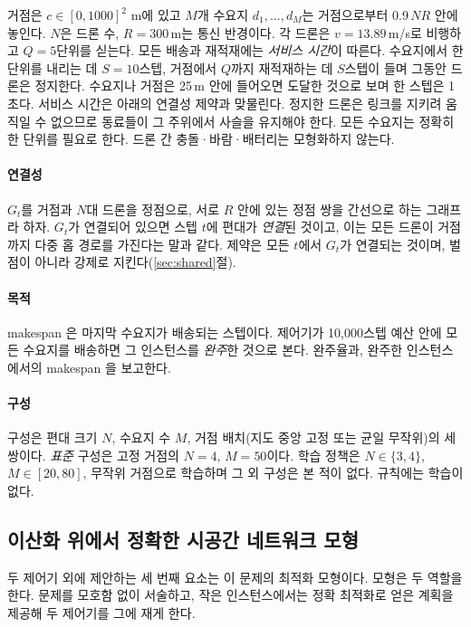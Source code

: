 \documentclass[final,5p,times,twocolumn]{elsarticle}
\begin{document}
거점은 $c \in [0,1000]^2$ m에 있고 $M$개 수요지 $d_1,\dots,d_M$는 거점으로부터 $0.9\,N R$
안에 놓인다. $N$은 드론 수, $R = 300$\,m는 통신 반경이다. 각 드론은 $v = 13.89$\,m/s로 비행하고
$Q = 5$단위를 싣는다. 모든 배송과 재적재에는 \emph{서비스 시간}이 따른다. 수요지에서 한 단위를
내리는 데 $S = 10$스텝, 거점에서 $Q$까지 재적재하는 데 $S$스텝이 들며 그동안 드론은 정지한다.
수요지나 거점은 25\,m 안에 들어오면 도달한 것으로 보며 한 스텝은 1초다. 서비스 시간은 아래의
연결성 제약과 맞물린다. 정지한 드론은 링크를 지키려 움직일 수 없으므로 동료들이 그 주위에서 사슬을
유지해야 한다. 모든 수요지는 정확히 한 단위를 필요로 한다. 드론 간 충돌·바람·배터리는 모형화하지
않는다.

\paragraph{연결성}
$G_t$를 거점과 $N$대 드론을 정점으로, 서로 $R$ 안에 있는 정점 쌍을 간선으로 하는 그래프라 하자.
$G_t$가 연결되어 있으면 스텝 $t$에 편대가 \emph{연결}된 것이고, 이는 모든 드론이 거점까지 다중 홉
경로를 가진다는 말과 같다. 제약은 모든 $t$에서 $G_t$가 연결되는 것이며, 벌점이 아니라 강제로
지킨다(\ref{sec:shared}절).

\paragraph{목적}
makespan 은 마지막 수요지가 배송되는 스텝이다. 제어기가 10{,}000스텝 예산 안에 모든 수요지를
배송하면 그 인스턴스를 \emph{완주}한 것으로 본다. 완주율과, 완주한 인스턴스에서의 makespan 을
보고한다.

\paragraph{구성}
구성은 편대 크기 $N$, 수요지 수 $M$, 거점 배치(지도 중앙 고정 또는 균일 무작위)의 세 쌍이다.
\emph{표준} 구성은 고정 거점의 $N=4$, $M=50$이다. 학습 정책은 $N \in \{3,4\}$, $M \in [20,80]$,
무작위 거점으로 학습하며 그 외 구성은 본 적이 없다. 규칙에는 학습이 없다.


\subsection{이산화 위에서 정확한 시공간 네트워크 모형}
\label{sec:milp-model}

두 제어기 외에 제안하는 세 번째 요소는 이 문제의 최적화 모형이다. 모형은 두 역할을 한다. 문제를
모호함 없이 서술하고, 작은 인스턴스에서는 정확 최적화로 얻은 계획을 제공해 두 제어기를 그에 재게
한다.
\end{document}
